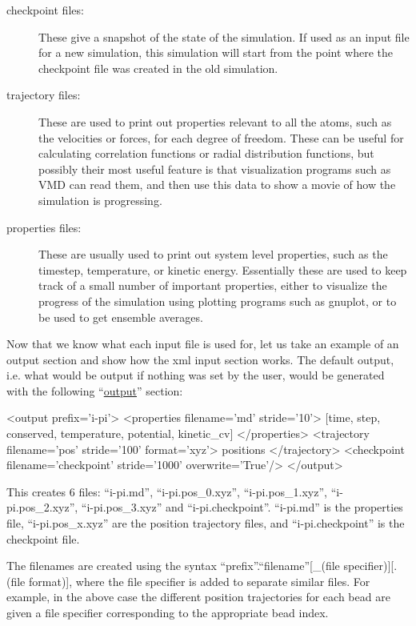 \documentclass[11pt,english,fleqn]{report}
\newenvironment{code}{%
\footnotesize 
\verbatim
}{
\endverbatim
\normalsize
}
\begin{document}
\begin{description}
\item[checkpoint files:]
These give a snapshot of the state of the simulation.
If used as an input file for a new \ipi simulation,
this simulation will start from the point where the
checkpoint file was created in the old simulation.
\item[trajectory files:] 
These are used to print out properties
relevant to all the atoms, such as the velocities or forces, for each degree of freedom.
These can be useful
for calculating correlation functions or radial distribution functions,
but possibly their most useful feature is that visualization
programs such as VMD can read them, and then use this data to show
a movie of how the simulation is progressing. 
\item[properties files:] 
These are usually used to print out
system level properties, such as the timestep, temperature,
or kinetic energy. Essentially these are used to keep track of a small
number of important properties, either to visualize the
progress of the simulation using plotting programs such as gnuplot, 
or to be used to get ensemble averages.
\end{description}

Now that we know what each input file is used for, let us take an
example of an output section and show how the xml input section works.
The default output, i.e. what would be output if nothing was set by the user, 
would be generated with the following {}``\hyperref[OUTPUTS]{output}'' section:

\begin{code}
<output prefix='i-pi'>
   <properties filename='md' stride='10'>
      [time, step, conserved, temperature, potential, kinetic_cv]
   </properties>
   <trajectory filename='pos' stride='100' format='xyz'>
      positions
   </trajectory>
   <checkpoint filename='checkpoint' stride='1000' overwrite='True'/>
</output>
\end{code}

This creates 6 files: {}``i-pi.md'', {}``i-pi.pos\_0.xyz'',
{}``i-pi.pos\_1.xyz'', {}``i-pi.pos\_2.xyz'', {}``i-pi.pos\_3.xyz''
and {}``i-pi.checkpoint''. 
{}``i-pi.md'' is the properties file, {}``i-pi.pos\_x.xyz'' are the
position trajectory files, and {}``i-pi.checkpoint'' is the
checkpoint file.

The filenames are created using the syntax 
{}``prefix''.{}``filename''[\_(file specifier)][.(file format)], where the file specifier is
added to separate similar files. For example, in the above case the 
different position trajectories for each bead are given a file specifier
corresponding to the appropriate bead index.
\end{document}
